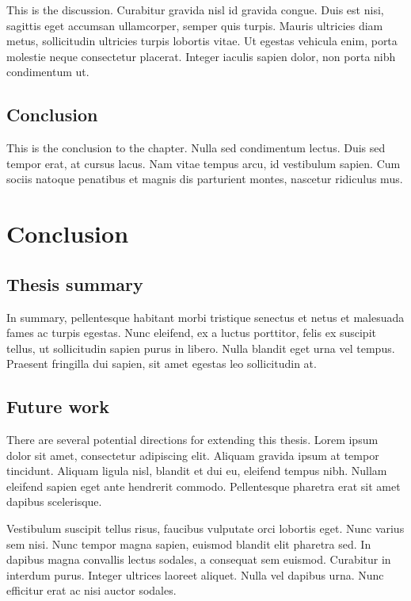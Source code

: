 \documentclass[11pt,letterpaper,]{article}
\begin{document}
This is the discussion. Curabitur gravida nisl id gravida congue. Duis
est nisi, sagittis eget accumsan ullamcorper, semper quis turpis. Mauris
ultricies diam metus, sollicitudin ultricies turpis lobortis vitae. Ut
egestas vehicula enim, porta molestie neque consectetur placerat.
Integer iaculis sapien dolor, non porta nibh condimentum ut.

\subsection{Conclusion}\label{conclusion-4}

This is the conclusion to the chapter. Nulla sed condimentum lectus.
Duis sed tempor erat, at cursus lacus. Nam vitae tempus arcu, id
vestibulum sapien. Cum sociis natoque penatibus et magnis dis parturient
montes, nascetur ridiculus mus.

\section{Conclusion}\label{conclusion-5}

\subsection{Thesis summary}\label{thesis-summary}

In summary, pellentesque habitant morbi tristique senectus et netus et
malesuada fames ac turpis egestas. Nunc eleifend, ex a luctus porttitor,
felis ex suscipit tellus, ut sollicitudin sapien purus in libero. Nulla
blandit eget urna vel tempus. Praesent fringilla dui sapien, sit amet
egestas leo sollicitudin at.

\subsection{Future work}\label{future-work}

There are several potential directions for extending this thesis. Lorem
ipsum dolor sit amet, consectetur adipiscing elit. Aliquam gravida ipsum
at tempor tincidunt. Aliquam ligula nisl, blandit et dui eu, eleifend
tempus nibh. Nullam eleifend sapien eget ante hendrerit commodo.
Pellentesque pharetra erat sit amet dapibus scelerisque.

Vestibulum suscipit tellus risus, faucibus vulputate orci lobortis eget.
Nunc varius sem nisi. Nunc tempor magna sapien, euismod blandit elit
pharetra sed. In dapibus magna convallis lectus sodales, a consequat sem
euismod. Curabitur in interdum purus. Integer ultrices laoreet aliquet.
Nulla vel dapibus urna. Nunc efficitur erat ac nisi auctor sodales.
\end{document}
